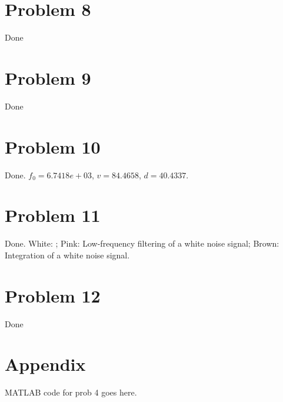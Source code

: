 \documentclass[10pt]{article}
\begin{document}
\section{Problem 8}
Done
\section{Problem 9}
Done
\section{Problem 10}
Done. $f_0 = 6.7418e+03$, $v = 84.4658$, $d=40.4337$.
\section{Problem 11}
Done. White: ; Pink: Low-frequency filtering of a white noise signal; Brown: Integration of a white noise signal.
\section{Problem 12}
Done
\section*{Appendix}
MATLAB code for prob 4 goes here.
\end{document}

